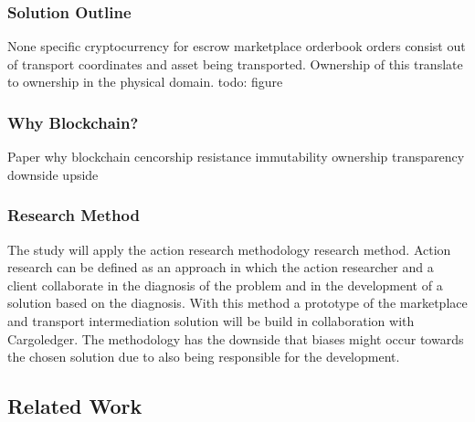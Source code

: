 \subsubsection{Solution Outline}

None specific cryptocurrency for escrow
marketplace orderbook orders consist out of transport coordinates and asset being transported. Ownership of this translate to ownership in the physical domain.
todo: figure

\subsubsection{Why Blockchain?}

Paper why blockchain
cencorship resistance
immutability
ownership
transparency
downside
upside

\subsubsection{Research Method}

The study will apply the action research methodology research method. Action research can be defined as an approach in which the action researcher and a client collaborate in the diagnosis of the problem and in the development of a solution based on the diagnosis. With this method a prototype of the marketplace and transport intermediation solution will be build in collaboration with Cargoledger. The methodology has the downside that biases might occur towards the chosen solution due to also being responsible for the development.\par

\subsection{Related Work}
